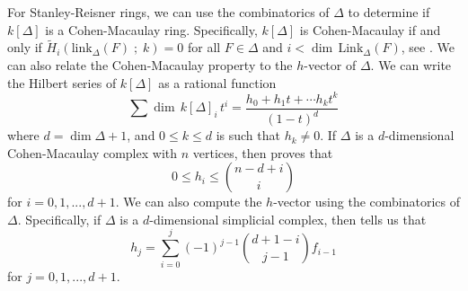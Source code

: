\documentclass[12pt,leqno]{amsart}
\theoremstyle{definition}
\begin{document}

For Stanley-Reisner rings, we can use the combinatorics of $\Delta$ to determine if $k[\Delta]$ is a Cohen-Macaulay ring. Specifically, $k[\Delta]$ is Cohen-Macaulay if and only if $\widetilde H_i(\mathrm{link}_\Delta(F)\; ;\;k) = 0$ for all $F \in \Delta$ and $i < \dim \hspace{2pt} \mathrm{Link}_\Delta(F)$, see \cite[Corollary 5.3.9]{BH}. We can also relate the Cohen-Macaulay property to the $h$-vector of $\Delta$. We can write the Hilbert series of $k[\Delta]$ as a rational function
%
\begin{displaymath}
  \sum \dim \hspace{2pt} k[\Delta]_i \hspace{2pt} t^i = \frac {h_0 + h_1t + \cdots h_k t^k}{(1-t)^d}
\end{displaymath}
%
where $d = \dim \Delta + 1$, and $0 \leq k \leq d$ is such that $h_k \not = 0$. If $\Delta$ is a $d$-dimensional Cohen-Macaulay complex with $n$ vertices, then \cite[Lemma 5.1.10]{BH} proves that
%
\begin{displaymath}
  0 \leq h_i \leq \binom{n-d+i}{i}
\end{displaymath}
%
for $i = 0,1,...,d+1$. We can also compute the $h$-vector using the combinatorics of $\Delta$. Specifically, if $\Delta$ is a $d$-dimensional simplicial complex, then \cite[Lemma 5.18]{BH} tells us that
%
\begin{displaymath}
  h_j = \sum_{i=0}^j (-1)^{j-1} \binom{d+1-i}{j-1}f_{i-1}
\end{displaymath}
%
for $j = 0,1,...,d+1$.
%
\end{document}
